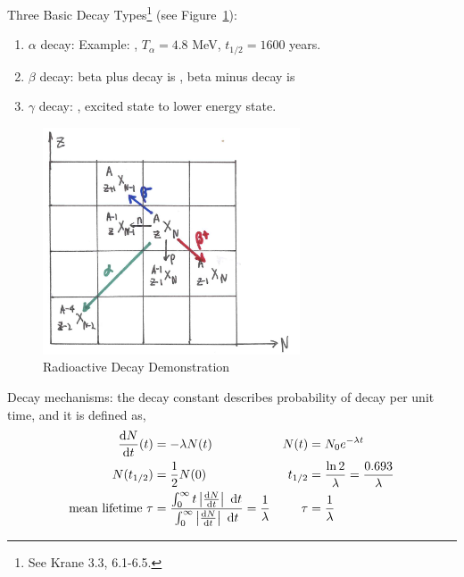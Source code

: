 \documentclass{school-22.101-notes}
\date{November 16, 2011}
\begin{document}
\maketitle


Three Basic Decay Types\footnote{See Krane 3.3, 6.1-6.5.} (see Figure~\ref{Z-N-grid}):
\begin{enumerate}
\item $\alpha$ decay:
Example: , $T_{\alpha} = 4.8$ MeV, $t_{1/2} = 1600$ years. 
\item $\beta$ decay: beta plus decay is , beta minus decay is 
\item $\gamma$ decay: , excited state to lower energy state.
\end{enumerate}
\begin{figure}[h]
    \centering
    \includegraphics[width=3in]{images/rd/Z-N-grid.png}
    \caption{Radioactive Decay Demonstration \label{Z-N-grid}}
\end{figure}


Decay mechanisms: the decay constant describes probability of decay per unit time, and it is defined as, 
\begin{align}
\frac{\mathrm{d}N}{\mathrm{d}t} (t) &= - \lambda N(t) &  N(t) &= N_0 e^{-\lambda  t} \\
N(t_{1/2}) &= \frac{1}{2} N(0) & t_{1/2} &= \frac{\ln 2}{\lambda} = \frac{0.693}{\lambda} \\
\mbox{mean lifetime }\tau &= \frac{\int_0^{\infty} t \left| \frac{\mathrm{d}N}{\mathrm{d}t} \right| \mbox{ }\mathrm{d} t }{\int_0^{\infty}  \left| \frac{\mathrm{d}N}{\mathrm{d}t} \right| \mbox{ }\mathrm{d} t} = \frac{1}{\lambda} & \tau &= \frac{1}{\lambda}
\end{align}
\end{document}
